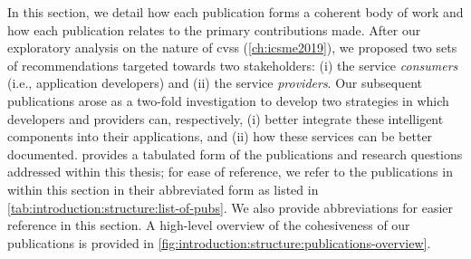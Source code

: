 In this section, we detail how each publication forms a coherent body of work and how each publication relates to the primary contributions made.
\oldcontent
After our exploratory analysis on the nature of \glspl{cvs} (\cref{ch:icsme2019}), we proposed two sets of recommendations targeted towards two stakeholders: (i) the service \textit{consumers} (i.e., application developers) and (ii) the service \textit{providers}. Our subsequent publications arose as a two-fold investigation to develop two strategies in which developers and providers can, respectively, (i) better integrate these intelligent components into their applications, and (ii) how these services can be better documented.  provides a tabulated form of the publications and research questions addressed within this thesis; for ease of reference, we refer to the publications in within this section in their abbreviated form as listed in \cref{tab:introduction:structure:list-of-pubs}. We also provide abbreviations for easier reference in this section. A high-level overview of the cohesiveness of our publications is provided in \cref{fig:introduction:structure:publications-overview}.

